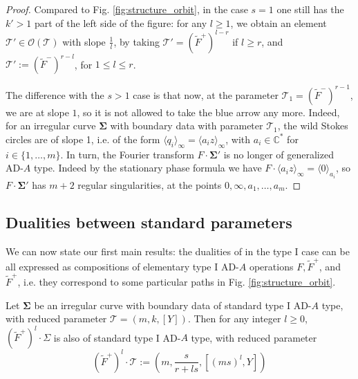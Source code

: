 \documentclass[11pt,a4paper]{amsart}
\numberwithin{equation}{section}
\newcommand{\cir}[1]{\langle #1 \rangle}
\begin{document}
\begin{proof}
Compared to Fig. \ref{fig:structure_orbit}, in the case $s=1$ one still has the $k'>1$ part of the left side of the figure: for any $l\geq 1$, we obtain an element $\mathcal T'\in \mathcal O(\mathcal T)$ with slope $\frac{1}{l}$, by taking $\mathcal T'=(\widetilde F^+)^{l-r}$ if $l\geq r$, and $\mathcal T':=(\widetilde F^-)^{r-l}$, for $1\leq l\leq r$.

The difference  with the $s>1$ case is that now, at the parameter $\mathcal T_1=(\widetilde F^-)^{r-1}$, we are at slope $1$, so it is not allowed to take the blue arrow any more. Indeed, for an irregular curve $\bm\Sigma$ with boundary data with parameter $\mathcal T_1$, the wild Stokes circles are of slope 1, i.e. of the form $\cir{q_i}_\infty=\cir{a_i z}_\infty$, with $a_i\in \mathbb C^*$ for $i\in \{1, \dots, m\}$. In turn, the Fourier transform $F\cdot \bm\Sigma'$ is no longer of generalized AD-$A$ type. Indeed by the stationary phase formula we have $F\cdot \cir{a_i z}_\infty=\cir{0}_{a_i}$, so $F\cdot \bm\Sigma'$ has $m+2$ regular singularities, at the points $0,\infty, a_1, \dots, a_m$.  
\end{proof}








\subsection{Dualities between standard parameters}

We can now state our first main results: the dualities of \cite{beem2025simplifying} in the type I case can be all expressed as compositions of elementary type I AD-$A$ operations $F, \widetilde F^+$, and $\widetilde F^+$, i.e. they correspond to some particular paths in Fig. \ref{fig:structure_orbit}.

\begin{proposition}
\label{prop:duality_I}
Let $\bm\Sigma$ be an irregular curve with boundary data of standard type I AD-$A$ type, with reduced parameter $\mathscr T=(m,k,[Y])$. 
Then for any integer $l\geq 0$, $(\widetilde{F}^+)^l\cdot\Sigma
$ is also of standard type I AD-$A$ type, with reduced parameter
\begin{equation}
\label{eq:main_duality_add_column}
(\widetilde{F}^+)^l\cdot\mathscr T:=\left(m, \frac{s}{r+ls}, [(ms)^l,Y]\right)
\end{equation}
\end{proposition}
\end{document}
